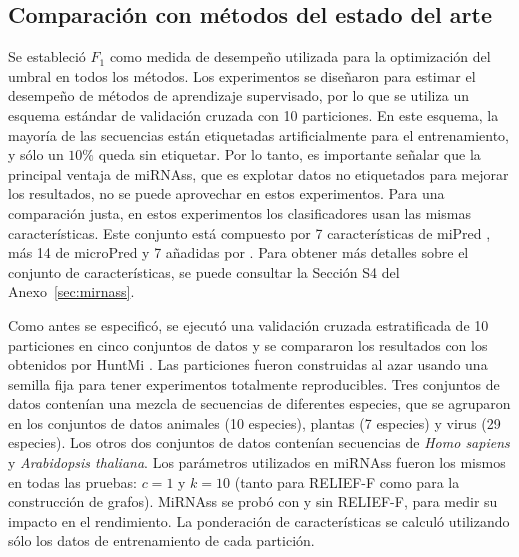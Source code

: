 \subsection{Comparación con métodos del estado del arte}
Se estableció $ F_{1} $ como medida de desempeño utilizada para la optimización del umbral en todos los métodos. Los experimentos se diseñaron para estimar el
desempeño de métodos de aprendizaje supervisado, por lo que se utiliza un esquema estándar de validación cruzada con 10 particiones. En este esquema, la mayoría
de las secuencias están etiquetadas artificialmente para el entrenamiento, y sólo un $ 10 \% $ queda sin etiquetar. Por lo tanto, es importante señalar que la
principal ventaja de miRNAss, que es explotar datos no etiquetados para mejorar los resultados, no se puede aprovechar en estos experimentos.  Para una
comparación justa, en estos experimentos los clasificadores usan las mismas características. Este conjunto está compuesto por 7 características de miPred
\citep{ng2007novo}, más 14 de microPred \citep{batuwita2009micropred} y 7 añadidas por \cite{gudys2013huntmi}. Para obtener más detalles sobre el conjunto de
características, se puede consultar la Sección S4 del Anexo~\ref{sec:mirnass}.

Como antes se especificó, se ejecutó una validación cruzada estratificada de 10 particiones en cinco conjuntos de datos y se compararon los resultados con
los obtenidos por HuntMi \citep{gudys2013huntmi}. Las particiones fueron construidas al azar usando una semilla fija para tener experimentos totalmente
reproducibles. Tres conjuntos de datos contenían una mezcla de secuencias de diferentes especies, que se agruparon en los conjuntos de datos animales (10
especies), plantas (7 especies) y virus (29 especies). Los otros dos conjuntos de datos contenían secuencias de \textit{Homo sapiens} y \textit{Arabidopsis
thaliana}. Los parámetros utilizados en miRNAss fueron los mismos en todas las pruebas: $ c = 1 $ y $ k = 10 $ (tanto para RELIEF-F como para la construcción
de grafos). MiRNAss se probó con y sin RELIEF-F, para medir su impacto en el rendimiento. La ponderación de características se calculó utilizando sólo los datos
de entrenamiento de cada partición.


